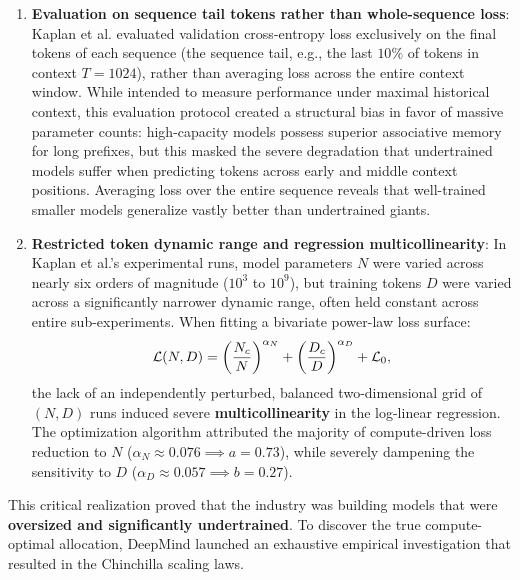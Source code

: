 \documentclass[../../main.tex]{subfiles}
\begin{document}
\begin{enumerate}
    \item \textbf{Evaluation on sequence tail tokens rather than whole-sequence loss}:
    Kaplan et al. evaluated validation cross-entropy loss exclusively on the final tokens of each sequence (the sequence tail, e.g., the last $10\%$ of tokens in context $T = 1024$), rather than averaging loss across the entire context window.
    While intended to measure performance under maximal historical context, this evaluation protocol created a structural bias in favor of massive parameter counts: high-capacity models possess superior associative memory for long prefixes, but this masked the severe degradation that undertrained models suffer when predicting tokens across early and middle context positions. Averaging loss over the entire sequence reveals that well-trained smaller models generalize vastly better than undertrained giants.

    \item \textbf{Restricted token dynamic range and regression multicollinearity}:
    In Kaplan et al.'s experimental runs, model parameters $N$ were varied across nearly six orders of magnitude ($10^3$ to $10^9$), but training tokens $D$ were varied across a significantly narrower dynamic range, often held constant across entire sub-experiments.
    When fitting a bivariate power-law loss surface:
    \begin{equation}
    \label{eq:kaplan_loss_surface}
    \mathcal{L}(N, D) = \left(\frac{N_c}{N}\right)^{\alpha_N} + \left(\frac{D_c}{D}\right)^{\alpha_D} + \mathcal{L}_0,
    \end{equation}
    the lack of an independently perturbed, balanced two-dimensional grid of $(N, D)$ runs induced severe \textbf{multicollinearity} in the log-linear regression. The optimization algorithm attributed the majority of compute-driven loss reduction to $N$ ($\alpha_N \approx 0.076 \implies a = 0.73$), while severely dampening the sensitivity to $D$ ($\alpha_D \approx 0.057 \implies b = 0.27$).
\end{enumerate}

This critical realization proved that the industry was building models that were \textbf{oversized and significantly undertrained}. To discover the true compute-optimal allocation, DeepMind launched an exhaustive empirical investigation that resulted in the Chinchilla scaling laws.

\clearpage
\end{document}
